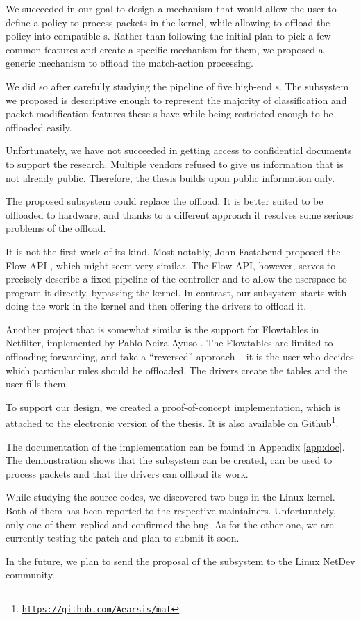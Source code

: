 
We succeeded in our goal to design a mechanism that would allow the user to
define a policy to process packets in the kernel, while allowing to offload the
policy into compatible s. Rather than following the initial plan to pick
a few common features and create a specific mechanism for them, we
proposed a generic mechanism to offload the match-action processing.

We did so after carefully studying the pipeline of five high-end s.
The subsystem we proposed is descriptive enough to represent the majority of
classification and packet-modification features these s have while
being restricted enough to be offloaded easily.

Unfortunately, we have not succeeded in getting access to confidential
documents to support the research. Multiple vendors refused to give us
information that is not already public. Therefore, the thesis builds upon
public information only.

The proposed subsystem could replace the  offload. It is better suited to be
offloaded to hardware, and thanks to a different approach it resolves some
serious problems of the  offload.

It is not the first work of its kind. Most notably, John Fastabend proposed
the Flow API \cite{flow-api}, which might seem very similar. The
Flow API, however, serves to precisely describe a fixed pipeline of the
controller and to allow the userspace to program it directly, bypassing the
kernel. In contrast, our subsystem starts with doing the work in the kernel and
then offering the drivers to offload it.

Another project that is somewhat similar is the support for Flowtables in
Netfilter, implemented by Pablo Neira Ayuso \cite{flowtables}. The Flowtables
are limited to offloading forwarding, and take a ``reversed'' approach -- it is
the user who decides which particular rules should be offloaded. The drivers
create the tables and the user fills them.

To support our design, we created a proof-of-concept implementation, which
is attached to the electronic version of the thesis. It is also available
on Github\footnote{\href{https://github.com/Aearsis/mat}{\texttt{https://github.com/Aearsis/mat}}}.

The documentation of the implementation can be found in Appendix
\ref{app:doc}. The demonstration shows that the subsystem can be created, can
be used to process packets and that the drivers can offload its work.

While studying the source codes, we discovered two bugs in the Linux kernel.
Both of them has been reported to the respective maintainers. Unfortunately,
only one of them replied and confirmed the bug. As for the other one, we are
currently testing the patch and plan to submit it soon.

In the future, we plan to send the proposal of the subsystem to the Linux
NetDev community.
